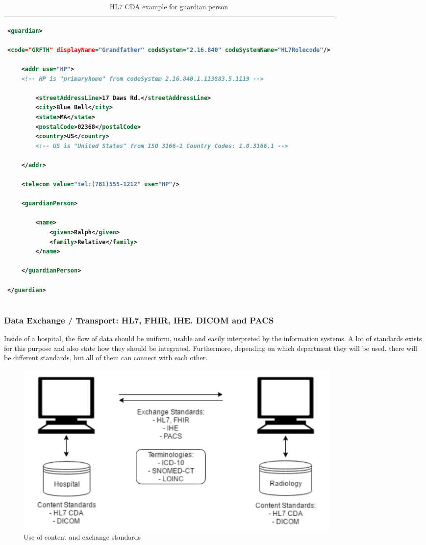 \documentclass[mim_thesis.tex]{subfiles}
\begin{document}
\begin{table}[H]
\caption{HL7 CDA example for guardian person}
\label{tab:hl7_cda}
\begin{tabular}{l}
\toprule[2pt]
\begin{lstlisting}[language=XML]
<guardian>

<code="GRFTH" displayName="Grandfather" codeSystem="2.16.840" codeSystemName="HL7Rolecode"/>

	<addr use="HP">
	<!-- HP is "primaryhome" from codeSystem 2.16.840.1.113883.5.1119 -->
    
		<streetAddressLine>17 Daws Rd.</streetAddressLine>
		<city>Blue Bell</city>
		<state>MA</state>
		<postalCode>02368</postalCode>
		<country>US</country>
		<!-- US is "United States" from ISO 3166-1 Country Codes: 1.0.3166.1 -->
        
	</addr>
    
	<telecom value="tel:(781)555-1212" use="HP"/>
    
	<guardianPerson>
    
		<name>
			<given>Ralph</given>
			<family>Relative</family>
		</name>
        
	</guardianPerson>
    
</guardian>
\end{lstlisting}
\tabularnewline \bottomrule[2pt]
\end{tabular}
\end{table}

\newpage
\subsubsection{Data Exchange / Transport: HL7, FHIR, IHE. DICOM and PACS }
Inside of a hospital, the flow of data should be uniform, usable and easily interpreted by the information systems. A lot of standards exists for this purpose and also state how they should be integrated. Furthermore, depending on which department they will be used, there will be different standards, but all of them can connect with each other.

\begin{figure}[H]
	\centering
    \includegraphics[width=0.80\textwidth]{img/content_exchage_standards.PNG}
	\caption{Use of content and exchange standards }
	\label{fig:content_exchage_standards}
\end{figure}
\end{document}
